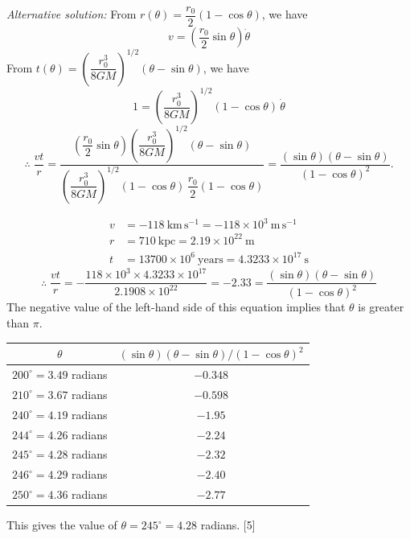\begin{description}
  \emph{Alternative solution:}
  From $r(\theta) = \dfrac{r_0}{2}(1-\cos\theta)$, we have
  \[
  v = \left(\frac{r_0}{2}\sin\theta\right)\dot\theta
  \]
  From $t(\theta) = \left(\dfrac{r_0^3}{8GM}\right)^{1/2}(\theta-\sin\theta)$,
  we have
  \[
  1 = \left(\frac{r_0^3}{8GM}\right)^{1/2}(1-\cos\theta)\,\dot\theta
  \]
  \begin{equation*}
  \therefore\;
  \frac{vt}{r}
  = \frac{\left(\dfrac{r_0}{2}\sin\theta\right)
      \left(\dfrac{r_0^3}{8GM}\right)^{1/2}(\theta-\sin\theta)}
      {\left(\dfrac{r_0^3}{8GM}\right)^{1/2}(1-\cos\theta)\,
       \dfrac{r_0}{2}(1-\cos\theta)}
  = \frac{(\sin\theta)(\theta-\sin\theta)}{(1-\cos\theta)^2}.
  \tag*{[10]}
  \end{equation*}

\item[e)]
  \begin{align*}
  v &= -118~\mathrm{km\,s^{-1}} = -118 \times 10^{3}~\mathrm{m\,s^{-1}} \\
  r &= 710~\mathrm{kpc} = 2.19 \times 10^{22}~\mathrm{m} \\
  t &= 13700 \times 10^{6}~\mathrm{years} = 4.3233 \times 10^{17}~\mathrm{s}
  \end{align*}
  \begin{equation*}
  \therefore\;
  \frac{vt}{r}
  = -\frac{118 \times 10^{3} \times 4.3233 \times 10^{17}}
          {2.1908 \times 10^{22}}
  = -2.33
  = \frac{(\sin\theta)(\theta-\sin\theta)}{(1-\cos\theta)^2}
  \tag*{[5]}
  \end{equation*}
  The negative value of the left-hand side of this equation implies that
  $\theta$ is greater than $\pi$.

  \begin{center}
  \begin{tabular}{cc}
  $\theta$ & $(\sin\theta)(\theta-\sin\theta)/(1-\cos\theta)^2$ \\
  \hline
  $200^\circ = 3.49$ radians & $-0.348$ \\
  $210^\circ = 3.67$ radians & $-0.598$ \\
  $240^\circ = 4.19$ radians & $-1.95$ \\
  $244^\circ = 4.26$ radians & $-2.24$ \\
  $245^\circ = 4.28$ radians & $-2.32$ \\
  $246^\circ = 4.29$ radians & $-2.40$ \\
  $250^\circ = 4.36$ radians & $-2.77$ \\
  \end{tabular}
  \end{center}
  This gives the value of $\theta = 245^\circ = 4.28$ radians. \hfill[5]


\end{description}
